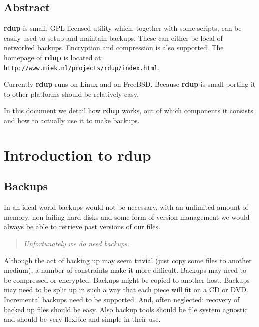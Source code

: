 \documentclass[a4paper, openany]{memoir}
\newcommand{\rdup}{\textbf{rdup}}
\newcommand{\url}[1]{\texttt{#1}}
\begin{document}
\section*{Abstract}
\rdup{} is small, GPL licensed utility which, together with some scripts, can
be easily used to setup and maintain backups. These can either be local
of networked backups. Encryption and compression is also supported.
The homepage of \rdup{} is located at: \\
\url{http://www.miek.nl/projects/rdup/index.html}.

Currently \rdup{} runs on Linux and on FreeBSD. Because \rdup{} is
small porting it to other platforms should be relatively easy.

In this document we detail how \rdup{} works, out of which components
it consists and how to actually use it to make backups.


\tableofcontents

\chapter{Introduction to \rdup}

\section{Backups}
In an ideal world backups would not be necessary, with an un\-limited
amount of memory, non failing hard disks and some form of version
management we would always be able to retrieve past versions of our files.
\begin{quote}
\emph{Unfortunately we do need backups.}
\end{quote}
Although the act of backing up may seem trivial (just copy some files
to another medium), a number of constraints make it more difficult. 
Backups may need to be compressed or encrypted. Backups might be copied
to another host. Backups may need to be split up in such a way that
each piece will fit on a CD or DVD. Incremental backups need to be
supported. And, often neglected: recovery of backed up
files should be easy.  Also backup tools should be file system agnostic
and should be very flexible and simple in their use.
\end{document}
